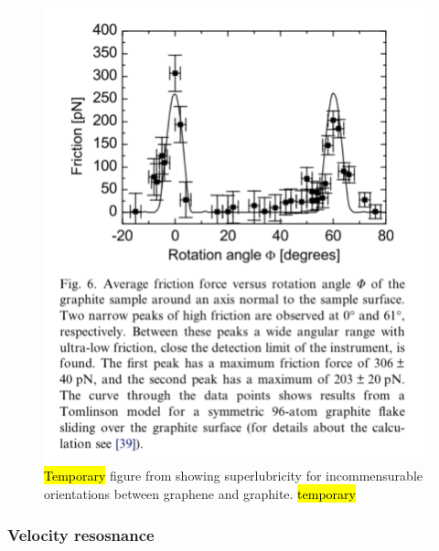 \begin{figure}[H]
  \centering
  \includegraphics[width=0.5\linewidth]{figures/theory/graphene_rot.png}
  \caption{\hl{Temporary} figure from \cite{DIENWIEBEL2005197} showing superlubricity for incommensurable orientations between graphene and graphite. \hl{temporary}}
  \label{fig:graphene_rot}
\end{figure}










\subsubsection{Velocity resosnance} %



